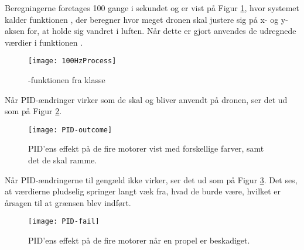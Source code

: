 \documentclass[Main]{subfiles}
\begin{document}
Beregningerne foretages 100 gange i sekundet og er vist på Figur \ref{Fig:100HzProcess}, hvor systemet kalder funktionen , der beregner hvor meget dronen skal justere sig på x- og y-aksen for, at holde sig vandret i luften.
Når dette er gjort anvendes de udregnede værdier i funktionen .

\begin{figure}[H]
\centering
\texttt{[image: 100HzProcess]}
\caption{-funktionen fra klasse }
\label{Fig:100HzProcess}
\end{figure}

Når PID-ændringer virker som de skal og bliver anvendt på dronen, ser det ud som på Figur \ref{Fig:PID-outcome}.

\begin{figure}[htbp]
\centering
\texttt{[image: PID-outcome]}
\caption{PID'ens effekt på de fire motorer vist med forskellige farver, samt det de skal ramme.}
\label{Fig:PID-outcome}
\end{figure}

Når PID-ændringerne til gengæld ikke virker, ser det ud som på Figur \ref{Fig:PID-fail}.
Det ses, at værdierne pludselig springer langt væk fra, hvad de burde være, hvilket er årsagen til at grænsen blev indført.

\begin{figure}[htbp]
\centering
\texttt{[image: PID-fail]}
\caption{PID'ens effekt på de fire motorer når en propel er beskadiget.}
\label{Fig:PID-fail}
\end{figure}
\end{document}
